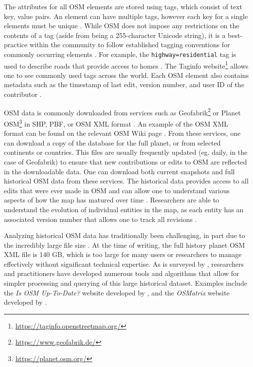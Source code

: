 The attributes for all OSM elements are stored using tags, which consist of text key, value pairs. An element can have multiple tags, however each key for a single elements must be unique \parencite{noauthor_tags_2020}. While OSM does not impose any restrictions on the contents of a tag (aside from being a 255-character Unicode string), it is a best-practice within the community to follow established tagging conventions for commonly occurring elements \parencite{noauthor_tags_2020}. For example, the \texttt{highway=residential} tag is used to describe roads that provide access to homes \parencite{noauthor_elements_2020}. The Taginfo website\footnote{\url{https://taginfo.openstreetmap.org/}} allows one to see commonly used tags across the world. Each OSM element also contains metadata such as the timestamp of last edit, version number, and user ID of the contributor \parencite{noauthor_elements_2020}. 

OSM data is commonly downloaded from services such as Geofabrik\footnote{\url{https://www.geofabrik.de/}} or Planet OSM\footnote{\url{https://planet.osm.org/}} in SHP, PBF, or OSM XML format \parencite{mooney_accessing_2011}. An example of the OSM XML format can be found on the relevant OSM Wiki page \parencite{noauthor_osm_2017}. From these services, one can download a copy of the database for the full planet, or from selected continents or countries. This files are usually frequently updated (eg. daily, in the case of Geofabrik) to ensure that new contributions or edits to OSM are reflected in the downloadable data. One can download both current snapshots and full historical OSM data from these services. The historical data provides access to all edits that were ever made in OSM and can allow one to understand various aspects of how the map has matured over time \parencite{corcoran_analysing_2013, mooney_characteristics_2012}. Researchers are able to understand the evolution of individual entities in the map, as each entity has an associated version number that allows one to track all revisions \parencite{noauthor_elements_2020}. 

Analyzing historical OSM data has traditionally been challenging, in part due to the incredibly large file size \parencite{raifer_oshdb_2019, mooney_accessing_2011}. At the time of writing, the full history planet OSM XML file is 140 GB, which is too large for many users or researchers to manage effectively without significant technical expertise. As is surveyed by \textcite{raifer_oshdb_2019}, researchers and practitioners have developed numerous tools and algorithms that allow for simpler processing and querying of this large historical dataset. Examples include the \textit{Is OSM Up-To-Date?} website developed by \textcite{minghini_open_2018}, and the \textit{OSMatrix} website developed by \textcite{roick_technical_2012}. 

